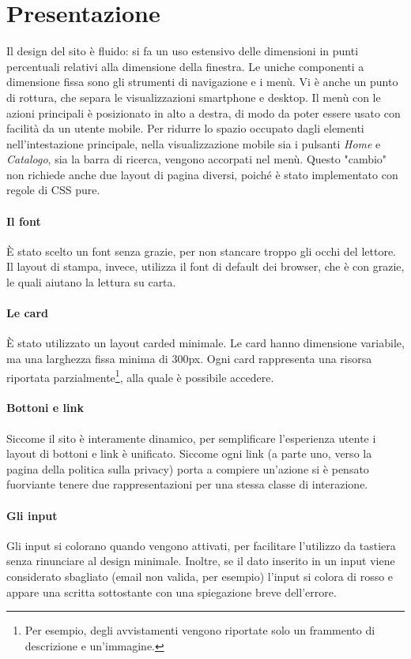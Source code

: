 \documentclass[12pt, a4paper]{article}
\begin{document}
    \section{Presentazione}
    Il design del sito è fluido: si fa un uso estensivo delle dimensioni in punti percentuali relativi alla dimensione della finestra. Le uniche componenti a dimensione fissa sono gli strumenti di navigazione e i menù. Vi è anche un punto di rottura, che separa le visualizzazioni smartphone e desktop.
    Il menù con le azioni principali è posizionato in alto a destra, di modo da poter essere usato con facilità da un utente mobile. Per ridurre lo spazio occupato dagli elementi nell'intestazione principale, nella visualizzazione mobile sia i pulsanti \textit{Home} e \textit{Catalogo}, sia la barra di ricerca, vengono accorpati nel menù. Questo "cambio" non richiede anche due layout di pagina diversi, poiché è stato implementato con regole di CSS pure.

    \paragraph{Il font} È stato scelto un font senza grazie, per non stancare troppo gli occhi del lettore. Il layout di stampa, invece, utilizza il font di default dei browser, che è con grazie, le quali aiutano la lettura su carta.

    \paragraph{Le card} È stato utilizzato un layout carded minimale. Le card hanno dimensione variabile, ma una larghezza fissa minima di 300px. Ogni card rappresenta una risorsa riportata parzialmente\footnote{Per esempio, degli avvistamenti vengono riportate solo un frammento di descrizione e un'immagine.}, alla quale è possibile accedere.

    \paragraph{Bottoni e link} Siccome il sito è interamente dinamico, per semplificare l'esperienza utente i layout di bottoni e link è unificato. Siccome ogni link (a parte uno, verso la pagina della politica sulla privacy) porta a compiere un'azione si è pensato fuorviante tenere due rappresentazioni per una stessa classe di interazione.

    \paragraph{Gli input} Gli input si colorano quando vengono attivati, per facilitare l'utilizzo da tastiera senza rinunciare al design minimale. Inoltre, se il dato inserito in un input viene considerato sbagliato (email non valida, per esempio) l'input si colora di rosso e appare una scritta sottostante con una spiegazione breve dell'errore.
\end{document}

